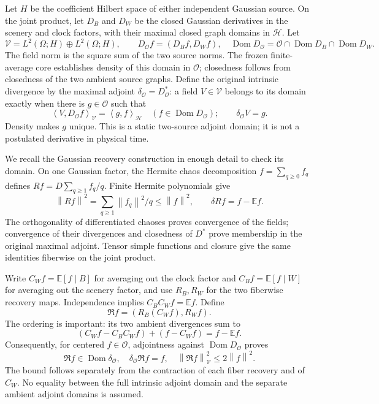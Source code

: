 \documentclass[11pt]{article}
\theoremstyle{remark}\newtheorem{remark}[theorem]{Remark}
\newcommand{\E}{\mathbb E}
\newcommand{\norm}[1]{\left\lVert#1\right\rVert}
\newcommand{\inner}[2]{\left\langle#1,#2\right\rangle}
\newcommand{\HH}{\mathcal H}
\newcommand{\OO}{\mathcal O}
\newcommand{\Dom}{\operatorname{Dom}}
\begin{document}
Let $H$ be the coefficient Hilbert space of either independent Gaussian
source. On the joint product, let $D_B$ and $D_W$ be the closed
Gaussian derivatives in the scenery and clock factors, with their
maximal closed graph domains in $\HH$. Let
\[
 \mathcal V=L^2(\Omega;H)\oplus L^2(\Omega;H),\qquad
 D_{\OO}f=(D_Bf,D_Wf),\quad
 \Dom D_{\OO}=\OO\cap\Dom D_B\cap\Dom D_W.
\]
The field norm is the square sum of the two source norms. The frozen
finite-average core establishes density of this domain in $\OO$;
closedness follows from closedness of the two ambient source graphs.
Define the original intrinsic divergence by the maximal adjoint
$\delta_{\OO}=D_{\OO}^*$: a field $V\in\mathcal V$ belongs to its
domain exactly when there is $g\in\OO$ such that
\begin{equation}\label{eq:adjoint}
 \inner V{D_{\OO}f}_{\mathcal V}=\inner g f_{\HH}
 \quad(f\in\Dom D_{\OO});
 \qquad \delta_{\OO}V=g.
\end{equation}
Density makes $g$ unique. This is a static two-source adjoint domain;
it is not a postulated derivative in physical time.

We recall the Gaussian recovery construction in enough detail to check
its domain. On one Gaussian factor, the Hermite chaos decomposition
$f=\sum_{q\geq0}f_q$ defines
$Rf=D\sum_{q\geq1}f_q/q$. Finite Hermite polynomials give
\[
 \norm{Rf}^2=\sum_{q\geq1}\norm{f_q}^2/q\leq\norm f^2,
 \qquad \delta Rf=f-\E f.
\]
The orthogonality of differentiated chaoses proves convergence of the
fields; convergence of their divergences and closedness of $D^*$
prove membership in the original maximal adjoint. Tensor simple
functions and closure give the same identities fiberwise on the joint
product.

Write $C_Wf=\E[f\mid B]$ for averaging out the clock factor and
$C_Bf=\E[f\mid W]$ for averaging out the scenery factor, and use
$R_B,R_W$ for the two fiberwise recovery maps. Independence implies
$C_BC_Wf=\E f$. Define
\begin{equation}\label{eq:recovery}
 \mathfrak R f=(R_B(C_Wf),R_Wf).
\end{equation}
The ordering is important: its two ambient divergences sum to
\[
 (C_Wf-C_BC_Wf)+(f-C_Wf)=f-\E f.
\]
Consequently, for centered $f\in\OO$, adjointness against
$\Dom D_{\OO}$ proves
\begin{equation}\label{eq:native}
 \mathfrak R f\in\Dom\delta_{\OO},\quad
 \delta_{\OO}\mathfrak R f=f,\quad
 \norm{\mathfrak R f}_{\mathcal V}^2\leq2\norm f^2.
\end{equation}
The bound follows separately from the contraction of each fiber
recovery and of $C_W$. No equality between the full intrinsic adjoint
domain and the separate ambient adjoint domains is assumed.
\end{document}

